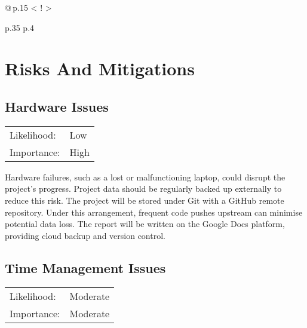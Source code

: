 \documentclass[]{final_report}
\newcommand{\foo}{\makebox[0pt]{\textbullet}\hskip-0.5pt\vrule width 1pt\hspace{\labelsep}}
\begin{document}
{\begin{longtable}{@{\,}p{} <{\hskip 2pt} !{\foo} >{\raggedright\arraybackslash}p{.35\textwidth} p{.4\textwidth}}
\end{longtable}
}



\chapter{Risks And Mitigations}

\section{Hardware Issues}

\begin{center}
    \begin{tabular}{l l}
    Likelihood: & Low \\
    Importance: & High \\
    \end{tabular}
  \end{center}

Hardware failures, such as a lost or malfunctioning laptop, could disrupt the project's progress. Project data should be regularly backed up externally to reduce this risk. The project will be stored under Git with a GitHub remote repository. Under this arrangement, frequent code pushes upstream can minimise potential data loss. The report will be written on the Google Docs platform, providing cloud backup and version control.


\section{Time Management Issues}

\begin{center}
    \begin{tabular}{l l  }
    Likelihood: & Moderate \\
    Importance: & Moderate \\
    \end{tabular}
  \end{center}
\end{document}
